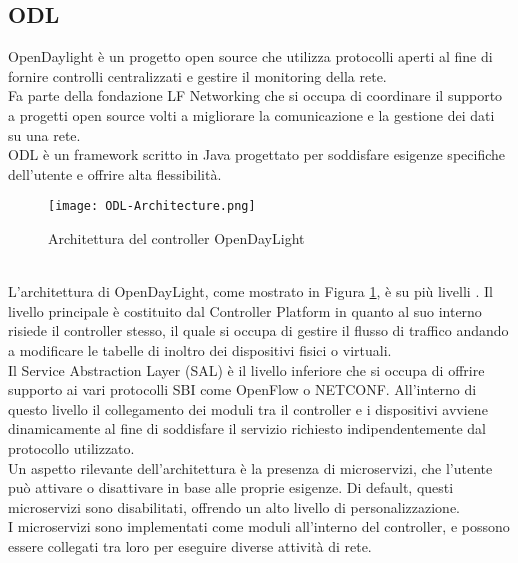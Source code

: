 \subsection{ODL}
OpenDaylight\cite{ODL} è un progetto open source che utilizza protocolli aperti al fine di fornire controlli centralizzati e gestire il monitoring della rete.
\\Fa parte della fondazione LF Networking \cite{LFN} che si occupa di coordinare il supporto a progetti open source volti a migliorare la comunicazione e la gestione dei dati su una rete.
\\ODL è un framework scritto in Java progettato per soddisfare esigenze specifiche dell'utente e offrire alta flessibilità. 
\begin{figure}[h]
    \centering
   \texttt{[image: ODL-Architecture.png]}
    \caption{Architettura del controller OpenDayLight \cite{archodl}}
    \label{fig:ArchODL}
\end{figure}
\\L'architettura di OpenDayLight, come mostrato in Figura \ref{fig:ArchODL}, è su più livelli \cite{tesiodl}. 
Il livello principale è costituito dal Controller Platform in quanto al suo interno risiede il controller stesso, il quale si 
occupa di gestire il flusso di traffico andando a modificare le tabelle di inoltro dei dispositivi fisici o virtuali. 
\\Il Service Abstraction Layer (SAL) è il livello inferiore che si occupa di offrire supporto ai vari protocolli SBI come OpenFlow o NETCONF. 
All'interno di questo livello il collegamento dei moduli tra il controller e i dispositivi avviene dinamicamente al fine di soddisfare il servizio richiesto indipendentemente dal protocollo utilizzato.
\\Un aspetto rilevante dell'architettura è la presenza di microservizi, che l'utente può attivare o disattivare in base alle proprie esigenze.
Di default, questi microservizi sono disabilitati, offrendo un alto livello di personalizzazione.
\\I microservizi sono implementati come moduli all'interno del controller, e possono essere collegati tra loro per eseguire diverse attività di rete. 
